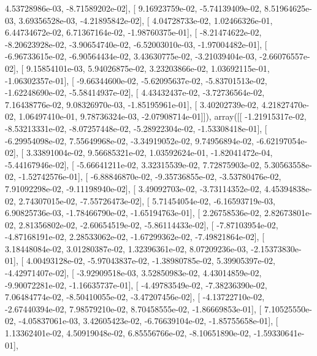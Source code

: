 \documentclass{article}
\begin{document}
          4.53728986e-03,  -8.71589202e-02],
       [  9.16923759e-02,  -5.74139409e-02,   8.51964625e-03,
          3.69356528e-03,  -4.21895842e-02],
       [  4.04728733e-02,   1.02466326e-01,   6.44734672e-02,
          6.71367164e-02,  -1.98760375e-01],
       [ -8.21474622e-02,  -8.20623928e-02,  -3.90654740e-02,
         -6.52003010e-03,  -1.97004482e-01],
       [ -6.96733615e-02,  -6.90564434e-02,   3.43630775e-02,
         -3.21039404e-03,  -2.66076557e-02],
       [  9.15854101e-03,   5.94026875e-02,   3.23203866e-02,
          1.03692115e-01,  -1.06302357e-01],
       [ -9.66344600e-02,  -5.62095637e-02,  -5.83701513e-02,
         -1.62248690e-02,  -5.58414937e-02],
       [  4.43432437e-02,  -3.72736564e-02,   7.16438776e-02,
          9.08326970e-03,  -1.85195961e-01],
       [  3.40202739e-02,   4.21827470e-02,   1.06497410e-01,
          9.78736324e-03,  -2.07908714e-01]]), array([[ -1.21915317e-02,  -8.53213331e-02,  -8.07257448e-02,
         -5.28922304e-02,  -1.53308418e-01],
       [ -6.29954098e-02,   7.55649968e-02,  -3.34919052e-02,
          9.74956894e-02,  -6.62197054e-02],
       [  3.33891004e-02,   9.56685321e-02,   1.03592624e-01,
         -1.82041472e-04,  -5.44167946e-02],
       [ -5.66641211e-02,   3.32315539e-02,   7.72875903e-02,
          5.30563558e-02,  -1.52742576e-01],
       [ -6.88846870e-02,  -9.35736855e-02,  -3.53780476e-02,
          7.91092298e-02,  -9.11198940e-02],
       [  3.49092703e-02,  -3.73114352e-02,   4.45394838e-02,
          2.74307015e-02,  -7.55726473e-02],
       [  5.71454054e-02,  -6.16593719e-03,   6.90825736e-03,
         -1.78466790e-02,  -1.65194763e-01],
       [  2.26758536e-02,   2.82673801e-02,   2.81356802e-02,
         -2.60654519e-02,  -5.86114433e-02],
       [ -7.87103954e-02,  -4.87168191e-02,   2.28533062e-02,
         -1.67299362e-02,  -7.49821864e-02],
       [  3.18448084e-02,   3.01280387e-02,   1.32396361e-02,
          8.07209236e-03,  -2.15373830e-01],
       [  4.00493128e-02,  -5.97043837e-02,  -1.38980785e-02,
          5.39905397e-02,  -4.42971407e-02],
       [ -3.92909518e-03,   3.52850983e-02,   4.43014859e-02,
         -9.90072281e-02,  -1.16635737e-01],
       [ -4.49783549e-02,  -7.38236390e-02,   7.06484774e-02,
         -8.50410055e-02,  -3.47207456e-02],
       [ -4.13722710e-02,  -2.67440394e-02,   7.98579210e-02,
          8.70458555e-02,  -1.86669853e-01],
       [  7.10525550e-02,  -4.05837061e-03,   3.42605423e-02,
         -6.76639104e-02,  -1.85755658e-01],
       [  1.13362401e-02,   4.50919048e-02,   6.85556766e-02,
         -8.10651890e-02,  -1.59330641e-01],
\end{document}
